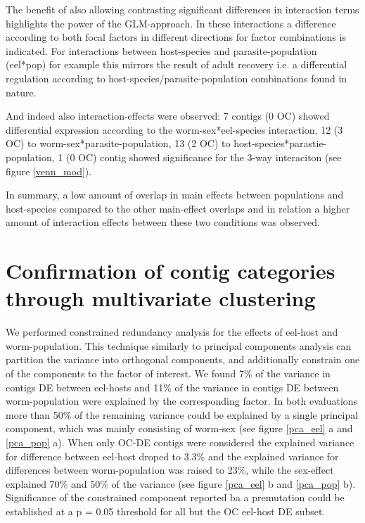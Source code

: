 The benefit of also allowing contrasting significant differences in
interaction terms highlights the power of the GLM-approach. In these
interactions a difference according to both focal factors in different
directions for factor combinations is indicated. For interactions
between host-species and parasite-population (eel*pop) for example
this mirrors the result of adult recovery i.e. a differential
regulation according to host-species/parasite-population combinations
found in nature.

And indeed also interaction-effects were observed: 7 contigs (0 OC)
showed differential expression according to the worm-sex*eel-species
interaction, 12 (3 OC) to worm-sex*parasite-population, 13 (2 OC) to
host-species*parastie-population, 1 (0 OC) contig showed significance
for the 3-way interaciton (see figure \ref{venn_mod}).


In summary, a low amount of overlap in main effects between
populations and host-species compared to the other main-effect
overlaps and in relation a higher amount of interaction effects
between these two conditions was observed.

\section{Confirmation of contig categories through multivariate
  clustering}

We performed constrained redundancy analysis for the effects of
eel-host and worm-population. This technique similarly to principal
components analysis can partition the variance into orthogonal
components, and additionally constrain one of the components to the
factor of interest. We found 7\% of the variance in contigs DE between
eel-hosts and 11\% of the variance in contigs DE between
worm-population were explained by the corresponding factor. In both
evaluations more than 50\% of the remaining variance could be
explained by a single principal component, which was mainly consisting
of worm-sex (see figure \ref{pca_eel} a and \ref{pca_pop} a). When
only OC-DE contigs were considered the explained variance for
difference between eel-host droped to 3.3\% and the explained variance
for differences between worm-population was raised to 23\%, while the
sex-effect explained 70\% and 50\% of the variance (see figure
\ref{pca_eel} b and \ref{pca_pop} b). Significance of the constrained
component reported ba a premutation could be established at a p = 0.05
threshold for all but the OC eel-host DE subset.

